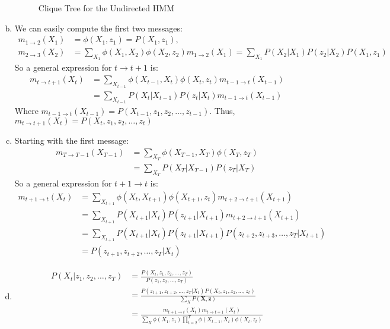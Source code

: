 \documentclass{article}
\begin{document}
\begin{enumerate}[(a)]
\begin{figure}[h]
\begin{tikzpicture}[xscale=2.0,yscale=1.0]
        \end{tikzpicture}
        \caption{Clique Tree for the Undirected HMM}
    \end{figure}
    \item We can easily compute the first two messages: \begin{align*}
        m_{1 \rightarrow 2}(X_1) &= \phi(X_1, z_1) = P(X_1, z_1), \\
        m_{2 \rightarrow 3}(X_2) &= \sum_{X_1}\phi(X_1, X_2) \phi(X_2, z_2) m_{1 \rightarrow 2}(X_1) = \sum_{X_1}P(X_2 | X_1)P(z_2 | X_2) P(X_1, z_1)
    \end{align*}
    So a general expression for $t \rightarrow t + 1$ is:
    \begin{align*}
        m_{t \rightarrow t + 1}(X_t) &= \sum_{X_{t - 1}} \phi(X_{t -1}, X_{t})\phi(X_{t}, z_{t}) m_{t - 1 \rightarrow t}(X_{t - 1}) \\
        &= \sum_{X_{t - 1}} P(X_{t} | X_{t - 1})P(z_t | X_t) m_{t - 1 \rightarrow t}(X_{t - 1})
    \end{align*}
    Where $m_{t - 1 \rightarrow t}(X_{t - 1}) = P(X_{t - 1}, z_1, z_2, \dots ,z_{t - 1})$. Thus, $m_{t\rightarrow t + 1}(X_t) = P(X_{t}, z_1, z_2, \dots ,z_{t})$
    \item Starting with the first message: \begin{align*}
        m_{T \rightarrow T - 1}(X_{T - 1}) &= \sum_{X_T}\phi(X_{T - 1}, X_T)\phi(X_T, z_T) \\
        &= \sum_{X_T} P(X_T | X_{T - 1})P(z_T | X_T)
    \end{align*}
    So a general expression for $t + 1 \rightarrow t$ is: \begin{align*}
        m_{t + 1 \rightarrow t}(X_t) &= \sum_{X_{t + 1}}\phi(X_t, X_{t + 1})\phi(X_{t + 1}, z_{t})m_{t + 2 \rightarrow t + 1}(X_{t + 1}) \\
        &= \sum_{X_{t + 1}}P(X_{t + 1} | X_t)P(z_{t + 1}|X_{t + 1})m_{t + 2 \rightarrow t + 1}(X_{t + 1})\\
        &= \sum_{X_{t + 1}}P(X_{t + 1} | X_t)P(z_{t + 1}|X_{t + 1})P(z_{t + 2}, z_{t + 3}, \dots , z_T | X_{t + 1})\\
        &= P(z_{t + 1}, z_{t + 2}, \dots , z_T | X_{t})
    \end{align*}
    \item \begin{align*}
        P(X_t | z_1, z_2, \dots , z_T) &= \frac{P(X_t, z_1, z_2, \dots , z_T)}{P(z_1, z_2, \dots , z_T)} \\[0.75ex]
        &= \frac{P(z_{t + 1}, z_{t + 2}, \dots , z_T | X_t)P(X_t, z_1, z_2, \dots , z_t)}{\sum_{X}P(\mathbf{X}, \mathbf{z})} \\[0.75ex]
        &= \frac{m_{t + 1 \rightarrow t}(X_t)m_{t \rightarrow t + 1}(X_t)}{\sum_X\phi(X_1, z_1)\prod_{t = 2}^T\phi(X_{t - 1}, X_t)\phi(X_t, z_t)}
    \end{align*}
\end{enumerate}
\end{document}
